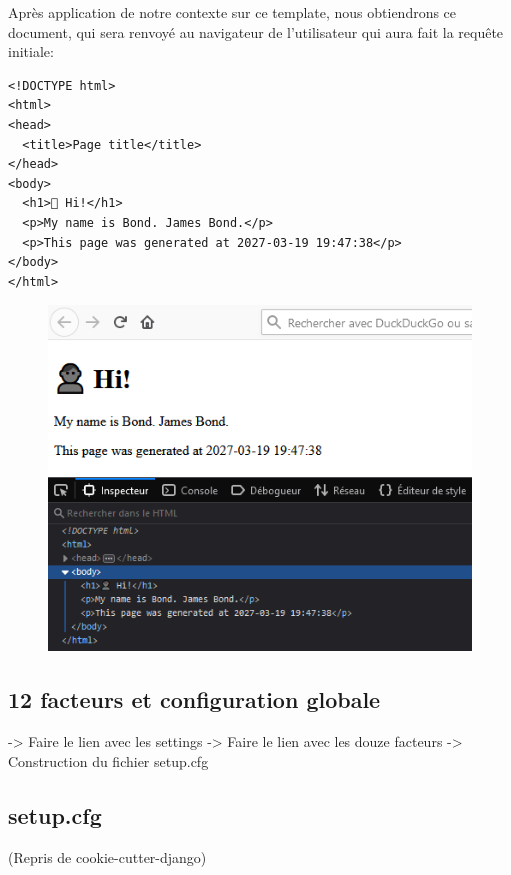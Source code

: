 \documentclass[11pt]{amsbook}
\begin{document}
Après application de notre contexte sur ce template, nous obtiendrons ce document, qui sera renvoyé au navigateur de l’utilisateur qui aura fait la requête initiale:


\begin{verbatim}
<!DOCTYPE html>
<html>
<head>
  <title>Page title</title>
</head>
<body>
  <h1>👤 Hi!</h1>
  <p>My name is Bond. James Bond.</p>
  <p>This page was generated at 2027-03-19 19:47:38</p>
</body>
</html>
\end{verbatim}

\begin{figure}[h]{}
\centering\includegraphics[width=2.5truein]{images/django/django-first-template.png}
\caption{}

\end{figure}

\hypertarget{x-12-facteurs-et-configuration-globale}{\subsection{12 facteurs et configuration globale}}
-> Faire le lien avec les settings
-> Faire le lien avec les douze facteurs
-> Construction du fichier setup.cfg


\hypertarget{x-setup.cfg}{\subsection{setup.cfg}}
(Repris de cookie-cutter-django)
\end{document}
